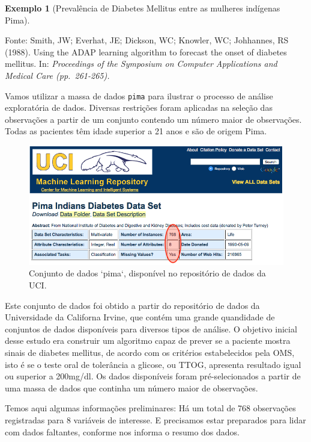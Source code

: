 \documentclass[
]{book}
\theoremstyle{definition}
\theoremstyle{definition}
\newtheorem{example}{Exemplo}[chapter]
\theoremstyle{definition}
\theoremstyle{remark}
\begin{document}
\begin{example}[Prevalência de Diabetes Mellitus entre as mulheres indígenas Pima]
\protect\hypertarget{exm:unnamed-chunk-1}{}{\label{exm:unnamed-chunk-1} {} }
\end{example}

Fonte: Smith, JW; Everhat, JE; Dickson, WC; Knowler, WC; Johhannes, RS (1988). Using the ADAP learning algorithm to forecast the onset of diabetes mellitus. In: \emph{Proceedings of the Symposium on Computer Applications and Medical Care (pp.~261-265).}

Vamos utilizar a massa de dados \texttt{pima} para ilustrar o processo de análise exploratória de dados. Diversas restrições foram aplicadas na seleção das observações a partir de um conjunto contendo um número maior de observações. Todas as pacientes têm idade superior a 21 anos e são de origem Pima.

\begin{figure}
\includegraphics[width=1\linewidth]{img/pima} \caption{Conjunto de dados `pima`, disponível no repositório de dados da UCI.}\label{fig:ch1-pima-uci}
\end{figure}

Este conjunto de dados foi obtido a partir do repositório de dados da Universidade da Californa Irvine, que contém uma grande quandidade de conjuntos de dados disponíveis para diversos tipos de análise. O objetivo inicial desse estudo era construir um algoritmo capaz de prever se a paciente mostra sinais de diabetes mellitus, de acordo com os critérios estabelecidos pela OMS, isto é se o teste oral de tolerância a glicose, ou TTOG, apresenta resultado igual ou superior a 200mg/dl. Os dados disponíveis foram pré-selecionados a partir de uma massa de dados que continha um número maior de observações.

Temos aqui algumas informações preliminares: Há um total de 768 observações registradas para 8 variáveis de interesse. E precisamos estar preparados para lidar com dados faltantes, conforme nos informa o resumo dos dados.
\end{document}
